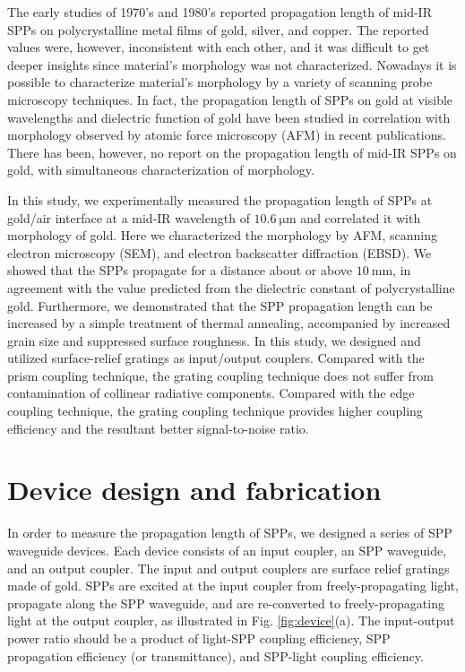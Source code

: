 \documentclass[aip,apl,reprint]{revtex4-1}
\begin{document}
\color{red}The early studies of 1970's and 1980's reported propagation length of mid-IR SPPs on polycrystalline metal films of gold,\cite{McMullen, Schlesinger1, Schlesinger2} silver,\cite{Schlesinger1, Schlesinger2} and copper.\cite{Schoenwald, Shiba} The reported values were, however, inconsistent with each other, and it was difficult to get deeper insights since material's morphology was not characterized. Nowadays it is possible to characterize material's morphology by a variety of scanning probe microscopy techniques. In fact, the propagation length of SPPs on gold at visible wavelengths\cite{Kuttge} and dielectric function of gold\cite{Trollmann, Olmon} have been studied in correlation with morphology observed by atomic force microscopy (AFM) in recent publications. There has been, however, no report on the propagation length of mid-IR SPPs on gold, with simultaneous characterization of morphology.\color{black}

\color{red}In this study, we experimentally measured the propagation length of SPPs at gold/air interface at a mid-IR wavelength of $10.6\:\mathrm{\mu m}$ and correlated it with morphology of gold.\color{black} Here we characterized the morphology by AFM, scanning electron microscopy (SEM), and electron backscatter diffraction (EBSD). We showed that the SPPs propagate for a distance about or above $10\:\mathrm{mm}$, in agreement with the value predicted from the dielectric constant of polycrystalline gold. \color{red}Furthermore, \color{black}we demonstrated that the SPP propagation length can be increased by a simple treatment of thermal annealing, accompanied by increased grain size and suppressed surface roughness.
In this study, we designed and utilized surface-relief gratings as input/output couplers. Compared with the prism coupling technique,\cite{Schoenwald, Shiba} the grating coupling technique does not suffer from contamination of collinear radiative components.\cite{Schlesinger1, Schlesinger2} Compared with the edge coupling technique,\cite{Schlesinger1, Schlesinger2} the grating coupling technique provides higher coupling efficiency and the resultant better signal-to-noise ratio. 

\section{Device design and fabrication}
\label{sec:device}
In order to measure the propagation length of SPPs, we designed a series of SPP waveguide devices. Each device consists of an input coupler, an SPP waveguide, and an output coupler.  The input and output couplers are surface relief gratings made of gold. SPPs are  excited at the input coupler from freely-propagating light, propagate along the SPP waveguide, and are re-converted to freely-propagating light at the output coupler, as illustrated in Fig. \ref{fig:device}(a). The input-output power ratio \color{red}should be a product of \color{black}light-SPP coupling efficiency, \color{red}SPP propagation efficiency (or transmittance), \color{black}and SPP-light coupling efficiency. 
\end{document}
